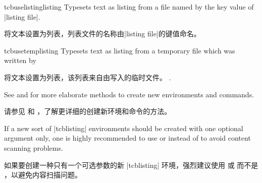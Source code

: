 \begin{docCommand}{tcbuselistinglisting}{}
Typesets text as listing from a file named by the key value of |listing file|.

将文本设置为列表，列表文件的名称由|listing file|的键值命名。
\begin{dispExample}
\tcbuselistinglisting
\end{dispExample}
\end{docCommand}

\begin{docCommand}{tcbusetemplisting}{}
Typesets text as listing from a temporary file which was written by

将文本设置为列表，该列表来自由写入的临时文件。
.
\end{docCommand}


\begin{marker}
See  and  for more
elaborate methods to create new environments and commands.

请参见  和 ，了解更详细的创建新环境和命令的方法。
\end{marker}
\begin{marker}
If a new sort of |tcblisting| environments should be created with
one optional argument only, one is highly recommended to use
 or 
instead of  to
avoid content scanning problems.

如果要创建一种只有一个可选参数的新 |tcblisting| 环境，强烈建议使用  或  而不是 ，以避免内容扫描问题。
\end{marker}

